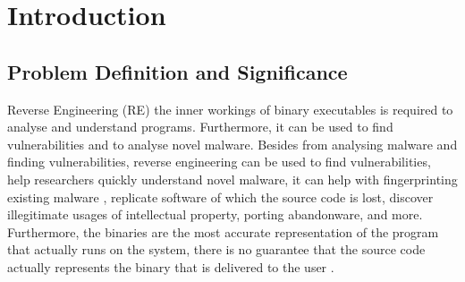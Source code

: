 \chapter{Introduction}
\label{introduction}




\section{Problem Definition and Significance}
Reverse Engineering (RE) the inner workings of binary executables is required to analyse and understand programs. Furthermore, it can be used to find vulnerabilities and to analyse novel malware. Besides from analysing malware and finding vulnerabilities, reverse engineering can be used to find vulnerabilities, help researchers quickly understand novel malware, it can help with fingerprinting existing malware \cite{TypeInferenceSurvey}, replicate software of which the source code is lost, discover illegitimate usages of intellectual property, porting abandonware, and more\cite{TypeInferenceSurvey}. Furthermore, the binaries are the most accurate representation of the program that actually runs on the system, there is no guarantee that the source code actually represents the binary that is delivered to the user \cite{TypeInferenceSurvey}.

